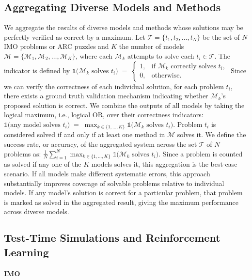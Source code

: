 \subsection{Aggregating Diverse Models and Methods}
\label{subsec:aggregation_strategy}

We aggregate the results of diverse models and methods whose solutions may be perfectly verified as correct by a maximum. Let $\mathcal{T} = \{t_1, t_2, \ldots, t_N\}$ be the set of $N$ IMO problems or ARC puzzles and $K$ the number of models $\mathcal{M} = \{\mathcal{M}_1, \mathcal{M}_2, \ldots, \mathcal{M}_K\}$,
where each \(\mathcal{M}_k\) attempts to solve each $t_i \in \mathcal{T}$. 
The indicator is defined by $
\mathds{1}\bigl(\mathcal{M}_k \text{ solves } t_i \bigr) \;=\;
\begin{cases}
1, & \text{if } \mathcal{M}_k \text{ correctly solves } t_i, \\
0, & \text{otherwise}.
\end{cases}
$
Since we can verify the correctness of each individual solution, for each problem $t_i$, there exists a ground truth validation mechanism indicating whether $\mathcal{M}_k$'s proposed solution is correct. We combine the outputs of all models by taking the logical maximum, i.e., logical OR, over their correctness indicators:
$\mathds{1}\bigl(\text{any model solves } t_i \bigr)
\;=\;
\max_{k \in \{1,\ldots,K\}}
\mathds{1}\bigl(\mathcal{M}_k \text{ solves } t_i \bigr)$.
Problem $t_i$ is considered solved if and only if at least one method in \(\mathcal{M}\) solves it. We define the success rate, or accuracy, of the aggregated system across the set $\mathcal{T}$ of $N$ problems as: 
$\frac{1}{N} \sum_{i=1}^N \max_{k \in \{1,\ldots,K\}}
\mathds{1}\bigl(\mathcal{M}_k \text{ solves } t_i \bigr)$. Since a problem is counted as solved if any one of the $K$ models solves it, this aggregation is the best-case scenario. If all models make different systematic errors, this approach substantially improves coverage of solvable problems relative to individual models. If any model's solution is correct for a particular problem, that problem is marked as solved in the aggregated result, giving the maximum performance across diverse models.

\subsection{Test-Time Simulations and Reinforcement Learning}


\paragraph{IMO}

